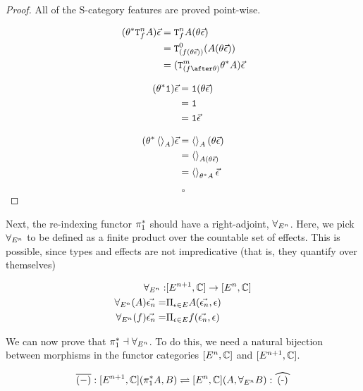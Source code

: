 \documentclass{Report}
\begin{document}
\begin{proof}
    All of the S-category features are proved point-wise.

    \begin{align}
        (\theta\star\Tn{f}{A})\ev & = \Tn{f}{A}(\theta\ev) \\
        & = \Tz{(f(\theta\ev))}{(A(\theta\ev))}\\
        & = (\Tm{(f\after\theta)}{\theta\star A})\ev\\
    \end{align}

    
\begin{align}
    (\theta^* \texttt{1})\vec{\epsilon} & = \texttt{1}(\theta\vec{\epsilon})\\
    & = \texttt{1} \\
    & = \texttt{1} \vec{\epsilon}\\
\end{align}

\begin{align}
    (\theta^*\left\langle\right\rangle_{A})\vec{\epsilon} & = \left\langle\right\rangle_{A}(\theta\vec{\epsilon})\\
    & = \left\langle\right\rangle_{A(\theta\vec{\epsilon})}\\
    & = \left\langle\right\rangle_{\theta^* A}\vec{\epsilon}
\end{align}

    $$\square$$
\end{proof}


Next, the re-indexing functor $\pi_1^*$ should have a right-adjoint, $\forall_{E^n}$. Here, we pick $\forall_{E^n}$ to be defined as a finite product over the countable set of effects. This is possible, since types and effects are not impredicative (that is, they quantify over themselves)

\begin{align}
    \forall_{E^n}:& [E^{n+1}, \mathbb{C}] \rightarrow [E^n, \mathbb{C}]\\
    \forall_{E^n}(A)\vec{\epsilon_n} =&\Pi_{\epsilon\in E}{A(\vec{\epsilon_n}, \epsilon)}
    \\ 
    \forall_{E^n}(f)\vec{\epsilon_n} =&\Pi_{\epsilon\in E}{f(\vec{\epsilon_n}, \epsilon)}
\end{align}


We can now prove that $\pi_1^* \dashv \forall_{E^n}$. To do this, we need a natural bijection between morphisms in the functor categories $[E^n, \mathbb{C}]$ and $[E^{n+1}, \mathbb{C}]$.

\begin{equation}
    \bar{(-)}: [E^{n+1}, \C](\pstar A, B) \rightleftharpoons [E^n,\C] (A, \allEn B): \widehat{(-)}
\end{equation}
\end{document}
